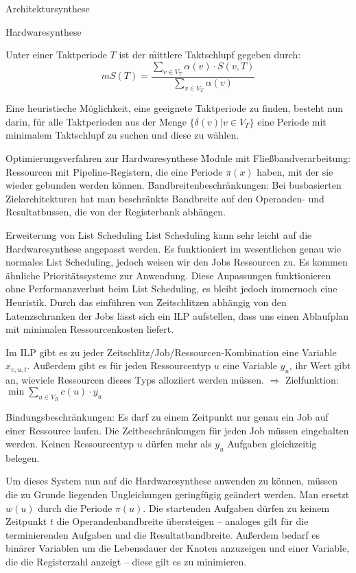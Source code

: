 \begin{chapter}{Architektursynthese}
\begin{section}{Hardwaresynthese}
 
 Unter einer Taktperiode $T$ ist der \f{mittlere Taktschlupf} gegeben durch:
 \[ mS(T) = \frac{\sum_{v\in V_T} \alpha(v) \cdot S(v,T)}{\sum_{v\in V_T} \alpha(v)} \]
 
 Eine heuristische Möglichkeit, eine geeignete Taktperiode zu finden, besteht nun darin, für alle Taktperioden aus der Menge $\{ \delta(v) | v\in V_T \}$ eine Periode mit minimalem Taktschlupf zu suchen und diese zu wählen.
\end{section}

\begin{section}{Optimierungsverfahren zur Hardwaresynthese}
 \f{Module mit Fließbandverarbeitung:} Ressourcen mit Pipeline-Registern, die eine Periode $\pi(x)$ haben, mit der sie wieder gebunden werden können. 
 \f{Bandbreitenbeschränkungen:} Bei busbasierten Zielarchitekturen hat man beschränkte Bandbreite auf den Operanden- und Resultatbussen, die von der Registerbank abhängen. 
 
 \begin{subsection}{Erweiterung von List Scheduling}
  List Scheduling kann sehr leicht auf die Hardwaresynthese angepasst werden. Es funktioniert im wesentlichen genau wie normales List Scheduling, jedoch weisen wir den Jobs Ressourcen zu. Es kommen ähnliche Prioritätssysteme zur Anwendung. Diese Anpassungen funktionieren ohne Performanzverlust beim List Scheduling, es bleibt jedoch immernoch eine Heuristik. Durch das einführen von \f{Zeitschlitzen} abhängig von den Latenzschranken der Jobs lässt sich ein ILP aufstellen, dass uns einen Ablaufplan mit minimalen Ressourcenkosten liefert. 
  
  Im ILP gibt es zu jeder Zeitschlitz/Job/Ressourcen-Kombination eine Variable $x_{v,u,t}$. Außerdem gibt es für jeden Ressourcentyp $u$ eine Variable $y_u$, ihr Wert gibt an, wieviele Ressourcen dieses Typs alloziiert werden müssen. $\Rightarrow$ Zielfunktion: $\min \sum_{u\in V_R} c(u) \cdot y_u$
  
  \f{Bindungsbeschränkungen:} Es darf zu einem Zeitpunkt nur genau ein Job auf einer Ressource laufen. Die Zeitbeschränkungen für jeden Job müssen eingehalten werden. Keinen Ressourcentyp $u$ dürfen mehr als $y_u$ Aufgaben gleichzeitig belegen.
  
  Um dieses System nun auf die Hardwaresynthese anwenden zu können, müssen die zu Grunde liegenden Ungleichungen geringfügig geändert werden. Man ersetzt $w(u)$ durch die Periode $\pi(u)$. Die startenden Aufgaben dürfen zu keinem Zeitpunkt $t$ die Operandenbandbreite übersteigen -- analoges gilt für die terminierenden Aufgaben und die Resultatbandbreite. Außerdem bedarf es binärer Variablen um die Lebensdauer der Knoten anzuzeigen und einer Variable, die die Registerzahl anzeigt -- diese gilt es zu minimieren.
  

\end{subsection}
\end{section}
\end{chapter}
